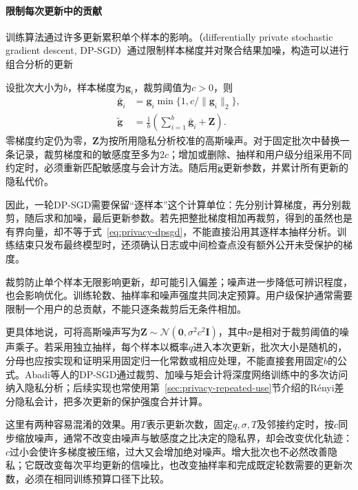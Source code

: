 \paragraph{限制每次更新中的贡献}

训练算法通过许多更新累积单个样本的影响。（differentially private stochastic gradient descent, DP-SGD）通过限制样本梯度并对聚合结果加噪，构造可以进行组合分析的更新

设批次大小为$b$，样本梯度为$\bm g_i$，裁剪阈值为$c>0$，则
\begin{equation}
 \begin{aligned}
 \bar{\bm g}_i
 &=\bm g_i\min\{1,c/\|\bm g_i\|_2\},\\
 \tilde{\bm g}
 &=\frac{1}{b}\left(\sum_{i=1}^{b}\bar{\bm g}_i+\bm Z\right).
 \end{aligned}
 \label{eq:privacy-dpsgd}
\end{equation}
零梯度约定仍为零，$\bm Z$为按所用隐私分析校准的高斯噪声。对于固定批次中替换一条记录，裁剪梯度和的敏感度至多为$2c$；增加或删除、抽样和用户级分组采用不同约定时，必须重新匹配敏感度与会计方法。随后用$\tilde{\bm g}$更新参数，并累计所有更新的隐私代价。

因此，一轮DP-SGD需要保留“逐样本”这个计算单位：先分别计算梯度，再分别裁剪，随后求和加噪，最后更新参数。若先把整批梯度相加再裁剪，得到的虽然也是有界向量，却不等于式~\eqref{eq:privacy-dpsgd}，不能直接沿用其逐样本抽样分析。训练结束只发布最终模型时，还须确认日志或中间检查点没有额外公开未受保护的梯度。

裁剪防止单个样本无限影响更新，却可能引入偏差；噪声进一步降低可辨识程度，也会影响优化。训练轮数、抽样率和噪声强度共同决定预算。用户级保护通常需要限制一个用户的总贡献，不能只逐条裁剪后无条件相加。

更具体地说，可将高斯噪声写为$\bm Z\sim\mathcal N(\bm0,\sigma^2c^2\bm I)$，其中$\sigma$是相对于裁剪阈值的噪声乘子。若采用独立抽样，每个样本以概率$q$进入本次更新，批次大小是随机的，分母也应按实现和证明采用固定归一化常数或相应处理，不能直接套用固定$b$的公式。Abadi等人的DP-SGD通过裁剪、加噪与矩会计将深度网络训练中的多次访问纳入隐私分析；后续实现也常使用第~\ref{sec:privacy-repeated-use}节介绍的Rényi差分隐私会计，把多次更新的保护强度合并计算。

这里有两种容易混淆的效果。用$T$表示更新次数，固定$q,\sigma,T$及邻接约定时，按$c$同步缩放噪声，通常不改变由噪声与敏感度之比决定的隐私界，却会改变优化轨迹：$c$过小会使许多梯度被压缩，过大又会增加绝对噪声。增大批次也不必然改善隐私；它既改变每次平均更新的信噪比，也改变抽样率和完成既定轮数需要的更新次数，必须在相同训练预算口径下比较。

